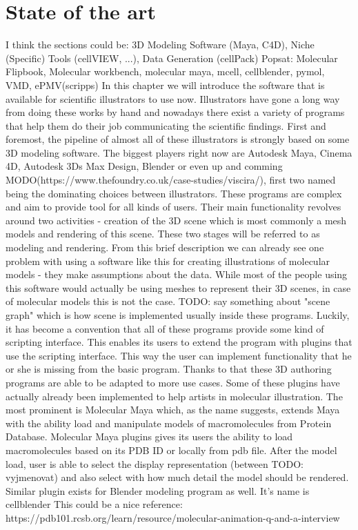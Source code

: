 \documentclass[
  digital, %
  table,   %
  lof,     %
  lot,     %
]{fithesis3}
\begin{document}
\chapter{State of the art}
I think the sections could be: 3D Modeling Software (Maya, C4D), Niche (Specific) Tools (cellVIEW, ...), Data Generation (cellPack)
Popsat: Molecular Flipbook, Molecular workbench, molecular maya, mcell, cellblender, pymol, VMD, ePMV(scripps)
In this chapter we will introduce the software that is available for scientific illustrators to use now. Illustrators have gone a long way from doing these works by hand and nowadays there exist a variety of programs that help them do their job communicating the scientific findings.
First and foremost, the pipeline of almost all of these illustrators is strongly based on some 3D modeling software. The biggest players right now are Autodesk Maya, Cinema 4D, Autodesk 3Ds Max Design, Blender or even up and comming MODO(https://www.thefoundry.co.uk/case-studies/viscira/), first two named being the dominating choices between illustrators. These programs are complex and aim to provide tool for all kinds of users. Their main functionality revolves around two activities - creation of the 3D scene which is most commonly a mesh models and rendering of this scene. These two stages will be referred to as modeling and rendering. From this brief description we can already see one problem with using a software like this for creating illustrations of molecular models - they make assumptions about the data. While most of the people using this software would actually be using meshes to represent their 3D scenes, in case of molecular models this is not the case. TODO: say something about "scene graph" which is how scene is implemented usually inside these programs.
Luckily, it has become a convention that all of these programs provide some kind of scripting interface. This enables its users to extend the program with plugins that use the scripting interface. This way the user can implement functionality that he or she is missing from the basic program. Thanks to that these 3D authoring programs are able to be adapted to more use cases. 
Some of these plugins have actually already been implemented to help artists in molecular illustration. The most prominent is Molecular Maya which, as the name suggests, extends Maya with the ability load and manipulate models of macromolecules from Protein Database. Molecular Maya plugins gives its users the ability to load macromolecules based on its PDB ID or locally from pdb file. After the model load, user is able to select the display representation (between TODO: vyjmenovat) and also select with how much detail the model should be rendered.
Similar plugin exists for Blender modeling program as well. It's name is cellblender
This could be a nice reference: https://pdb101.rcsb.org/learn/resource/molecular-animation-q-and-a-interview
\end{document}
